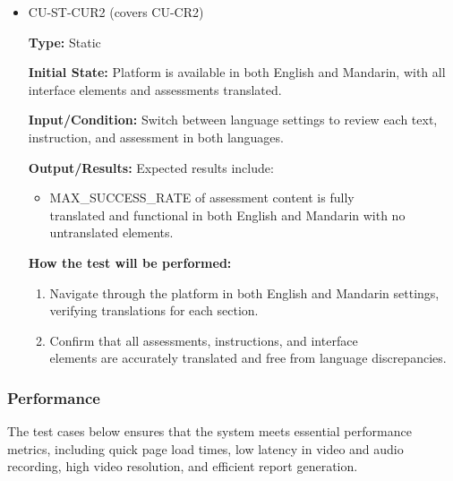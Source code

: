 \documentclass[12pt, titlepage]{article}
\begin{document}
\begin{itemize}
  \item CU-ST-CUR2 (covers CU-CR2)
  \begin{mdframed}[linewidth=0.5mm] 
    \textbf{Type:} Static \par 
    \textbf{Initial State:} Platform is available in both English and Mandarin, with all interface elements and assessments translated. \par 
    \textbf{Input/Condition:} Switch between language settings to review each text, instruction, and assessment in both languages. \par 
    \textbf{Output/Results:} Expected results include: 
    \begin{itemize} 
      \item MAX\_SUCCESS\_RATE of assessment content is fully \\translated and functional in both English and Mandarin with no \\untranslated elements. 
    \end{itemize} \par 
    \textbf{How the test will be performed:} 
    \begin{enumerate}[noitemsep] 
      \item Navigate through the platform in both English and Mandarin settings, verifying translations for each section. 
      \item Confirm that all assessments, instructions, and interface \\elements are accurately translated and free from language discrepancies. 
    \end{enumerate} 
  \end{mdframed} 
\end{itemize}



\subsubsection{Performance}
\hspace{2em}The test cases below ensures that the system meets essential performance metrics, 
including quick page load times, low latency in video and audio recording, high video 
resolution, and efficient report generation. 
\end{document}
